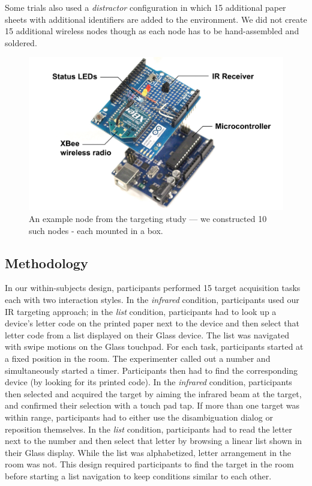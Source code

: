Some trials also used a {\em distractor} configuration in which 15 additional paper sheets with additional identifiers are added to the environment. We did not create 15 additional wireless nodes though as each node has to be hand-assembled and soldered.

\begin{figure}[b]
\centering
\includegraphics[width=0.8\columnwidth]{figures/study-node.pdf}
\caption{An example node from the targeting study --- we constructed 10 such nodes - each mounted in a box.}
\label{fig:targeting-study-layout}
\end{figure}

\subsection{Methodology}
In our within-subjects design, participants performed 15 target acquisition tasks each with two interaction styles. In the {\em infrared} condition, participants used our IR targeting approach; in the {\em list} condition, participants had to look up a device's letter code on the printed paper next to the device and then select that letter code from a list displayed on their Glass device. The list was navigated with swipe motions on the Glass touchpad. For each task, participants started at a fixed position in the room. The experimenter called out a number and simultaneously started a timer. Participants then had to find the corresponding device (by looking for its printed code). In the {\em infrared} condition, participants then selected and acquired the target by aiming the infrared beam at the target, and confirmed their selection with a touch pad tap. If more than one target was within range, participants had to either use the disambiguation dialog or reposition themselves. In the {\em list} condition, participants had to read the letter next to the number and then select that letter by browsing a linear list shown in their Glass display. While the list was alphabetized, letter arrangement in the room was not. This design required participants to find the target in the room before starting a list navigation to keep conditions similar to each other.

